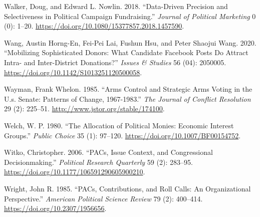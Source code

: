 \documentclass[12pt,]{article}
\begin{document}
\leavevmode\hypertarget{ref-walker2018}{}%
Walker, Doug, and Edward L. Nowlin. 2018. ``Data-Driven Precision and
Selectiveness in Political Campaign Fundraising.'' \emph{Journal of
Political Marketing} 0 (0): 1--20.
\url{https://doi.org/10.1080/15377857.2018.1457590}.

\leavevmode\hypertarget{ref-wang2020}{}%
Wang, Austin Horng-En, Fei-Pei Lai, Fushun Hsu, and Peter Shaojui Wang.
2020. ``Mobilizing Sophisticated Donors: What Candidate Facebook Posts
Do Attract Intra- and Inter-District Donations?'' \emph{Issues \&
Studies} 56 (04): 2050005.
\url{https://doi.org/10.1142/S1013251120500058}.

\leavevmode\hypertarget{ref-wayman1985}{}%
Wayman, Frank Whelon. 1985. ``Arms Control and Strategic Arms Voting in
the U.s. Senate: Patterns of Change, 1967-1983.'' \emph{The Journal of
Conflict Resolution} 29 (2): 225--51.
\url{http://www.jstor.org/stable/174100}.

\leavevmode\hypertarget{ref-welch1980}{}%
Welch, W. P. 1980. ``The Allocation of Political Monies: Economic
Interest Groups.'' \emph{Public Choice} 35 (1): 97--120.
\url{https://doi.org/10.1007/BF00154752}.

\leavevmode\hypertarget{ref-witko2006}{}%
Witko, Christopher. 2006. ``PACs, Issue Context, and Congressional
Decisionmaking.'' \emph{Political Research Quarterly} 59 (2): 283--95.
\url{https://doi.org/10.1177/106591290605900210}.

\leavevmode\hypertarget{ref-wright1985}{}%
Wright, John R. 1985. ``PACs, Contributions, and Roll Calls: An
Organizational Perspective.'' \emph{American Political Science Review}
79 (2): 400--414. \url{https://doi.org/10.2307/1956656}.





\newpage
\singlespacing 
\end{document}
